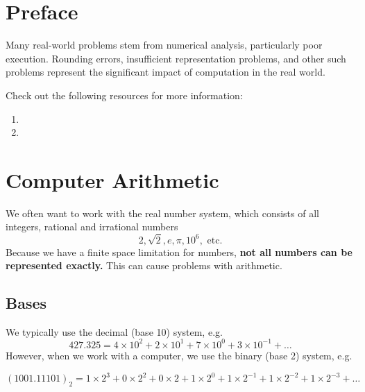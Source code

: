 \section{Preface}

Many real-world problems stem from numerical analysis, particularly poor 
execution. Rounding errors, insufficient representation problems, and other 
such problems represent the significant impact of computation in the real world.

Check out the following resources for more information:
\begin{enumerate}
  \item {}
  \item {}
\end{enumerate}

\section{Computer Arithmetic}

We often want to work with the real number system, which consists of all 
integers, rational and irrational numbers
\begin{equation*}
  2, \sqrt{2}, e, \pi, 10^6, \text{ etc.} 
\end{equation*}
Because we have a finite space limitation for numbers, 
\textbf{not all numbers can be represented exactly.} This can cause problems
with arithmetic.

\subsection{Bases}

We typically use the decimal (base 10) system, e.g.
\begin{equation*}
  427.325 = 4 \times 10^2 + 2 \times 10^1 + 7 \times 10^{0} + 3 \times 10^{-1}+\dots
\end{equation*}
However, when we work with a computer, we use the binary (base 2) system, e.g.

\begin{equation*}
  (1001.11101)_2 = 1\times 2^3 + 0\times 2^2 + 0\times 2 + 1\times 2^0 + 1\times 2^{-1} + 1\times 2^{-2} + 1\times 2^{-3} +\dots
\end{equation*}

